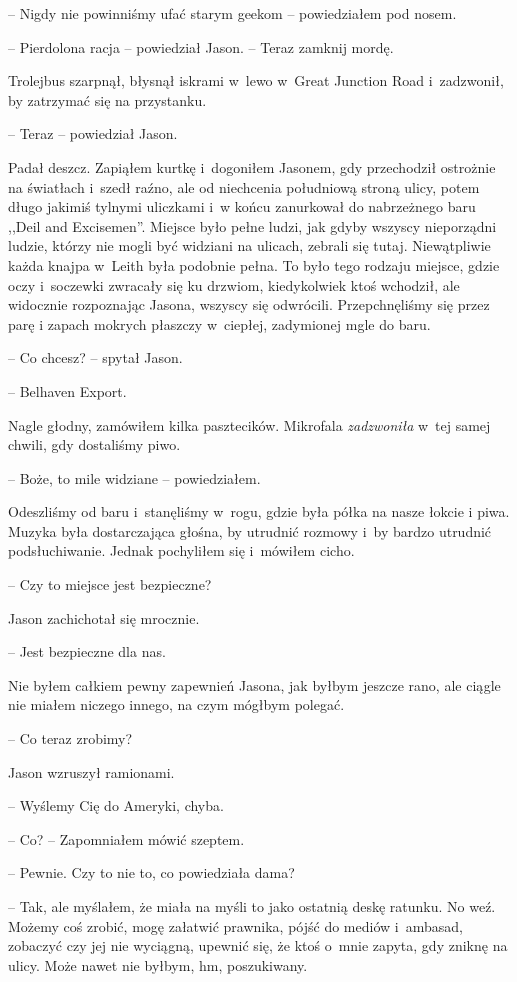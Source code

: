 \documentclass[oneside,polish,12pt,sfheadings]{mwbk}
\begin{document}
-- Nigdy nie powinniśmy ufać starym geekom -- powiedziałem pod nosem.

-- Pierdolona racja -- powiedział Jason. -- Teraz zamknij mordę.

Trolejbus szarpnął, błysnął iskrami w~lewo w~Great Junction Road i~zadzwonił, by zatrzymać się na przystanku.

-- Teraz -- powiedział Jason.

Padał deszcz. Zapiąłem kurtkę i~dogoniłem Jasonem, gdy przechodził
ostrożnie na światłach i~szedł raźno, ale od niechcenia południową
stroną ulicy, potem długo jakimiś tylnymi uliczkami i~w końcu zanurkował
do nabrzeżnego baru ,,Deil and Excisemen''. Miejsce było pełne ludzi, jak
gdyby wszyscy nieporządni ludzie, którzy nie mogli być widziani na
ulicach, zebrali się tutaj. Niewątpliwie każda knajpa w~Leith była
podobnie pełna. To było tego rodzaju miejsce, gdzie oczy i~soczewki
zwracały się ku drzwiom, kiedykolwiek ktoś wchodził, ale widocznie
rozpoznając Jasona, wszyscy się odwrócili. Przepchnęliśmy się przez parę
i zapach mokrych płaszczy w~ciepłej, zadymionej mgle do baru.

-- Co chcesz? -- spytał Jason.

-- Belhaven Export.

Nagle głodny, zamówiłem kilka pasztecików. Mikrofala \emph{zadzwoniła} w~tej samej chwili, gdy dostaliśmy piwo.

-- Boże, to mile widziane -- powiedziałem.

Odeszliśmy od baru i~stanęliśmy w~rogu, gdzie była półka na nasze łokcie
i piwa. Muzyka była dostarczająca głośna, by utrudnić rozmowy i~by
bardzo utrudnić podsłuchiwanie. Jednak pochyliłem się i~mówiłem cicho.

-- Czy to miejsce jest bezpieczne?

Jason zachichotał się mrocznie. 

-- Jest bezpieczne dla nas.

Nie byłem całkiem pewny zapewnień Jasona, jak byłbym jeszcze rano, ale
ciągle nie miałem niczego innego, na czym mógłbym polegać.

-- Co teraz zrobimy?

Jason wzruszył ramionami. 

-- Wyślemy Cię do Ameryki, chyba.

-- Co? -- Zapomniałem mówić szeptem.

-- Pewnie. Czy to nie to, co powiedziała dama?

-- Tak, ale myślałem, że miała na myśli to jako ostatnią deskę ratunku.
No weź. Możemy coś zrobić, mogę załatwić prawnika, pójść do mediów i~ambasad, zobaczyć czy jej nie wyciągną, upewnić się, że ktoś o~mnie
zapyta, gdy zniknę na ulicy. Może nawet nie byłbym, hm, poszukiwany.
\end{document}

